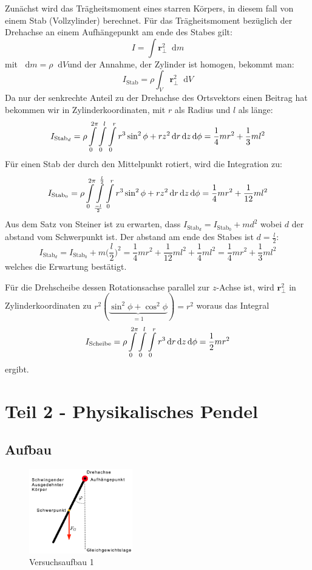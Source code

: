 \documentclass[11pt,a4paper]{article}
\newcommand\dif{\mathop{}\!\mathrm{d}}
\renewcommand{\vec}{\boldsymbol}
\begin{document}
Zunächst wird das Trägheitsmoment eines starren Körpers, in diesem fall von einem Stab (Vollzylinder) berechnet. Für das Trägheitsmoment bezüglich der Drehachse an einem Aufhängepunkt am ende des Stabes gilt:
$$I = \int \vec{r}_\perp^2 \dif m$$
mit $\dif m = \rho \dif V$und der Annahme, der Zylinder ist homogen, bekommt man: $$\displaystyle{I_{\textrm{Stab}} = \rho \int_V \vec{r}_\perp^2 \dif V}$$
Da nur der senkrechte Anteil zu der Drehachse des Ortsvektors einen Beitrag hat bekommen wir in Zylinderkoordinaten, mit $r$ als Radius und $l$ als länge:
$$I_{\textrm{Stab}_d} = \rho \int\displaylimits_{0}^{2\pi} \int\displaylimits_{0}^{l}\int\displaylimits_{0}^{r} r^3 \sin^2 \phi +rz^2 \dif r \dif z \dif\phi = \frac{1}{4} m r^2 + \frac{1}{3} m l^2 $$ 
Für einen Stab der durch den Mittelpunkt rotiert, wird die Integration zu:
$$I_{\textrm{Stab}_0} = \rho \int\displaylimits_{0}^{2\pi} \int\displaylimits_{\frac{-l}{2}}^{\frac{l}{2}}\int\displaylimits_{0}^{r} r^3 \sin^2 \phi +rz^2 \dif r \dif z \dif\phi = \frac{1}{4} m r^2 + \frac{1}{12} m l^2 $$
Aus dem Satz von Steiner ist zu erwarten, dass $I_{\textrm{Stab}_d} = I_{\textrm{Stab}_0} + md^2$ wobei $d$ der abstand vom  Schwerpunkt ist. Der abstand am ende des Stabes ist  $d = \frac{l}{2}$:
$$I_{\textrm{Stab}_d} = I_{\textrm{Stab}_0} + m\bigg(\frac{l}{2}\bigg)^2 = \frac{1}{4} m r^2 + \frac{1}{12} m l^2 + \frac{1}{4}ml^2 = \frac{1}{4} m r^2 + \frac{1}{3} m l^2$$
welches die Erwartung bestätigt.

Für die Drehscheibe dessen Rotationsachse parallel zur $z$-Achse ist, wird $\vec r_\perp^2$ in Zylinderkoordinaten zu $r^2(\underbrace{\sin^2\phi + \cos^2\phi}_{=1}) = r^2$ woraus das Integral
$$I_{\textrm{Scheibe}} = \rho \int\displaylimits_{0}^{2\pi} \int\displaylimits_{0}^{l}\int\displaylimits_{0}^{r} r^3 \dif r \dif z \dif\phi = \frac{1}{2}mr^2$$
ergibt.

\section{Teil 2 - Physikalisches Pendel}
\subsection{Aufbau}
\begin{figure}
\includegraphics[width=0.4\textwidth]{Spend}
\caption{Versuchsaufbau 1}
\label{JS1}
\end{figure}
\end{document}
